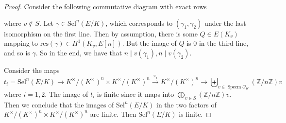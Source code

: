 \documentclass{article}
\newcommand{\ord}{\mathcal{O}}
\newcommand{\kmkn}{K ^{\times} / (K ^{\times})^{n}}
\newcommand{\kvmkn}[1]{(#1) ^{\times} / ((#1) ^{\times})^{n}}
\DeclareMathOperator{\spec}{Specm}
\begin{document}
\begin{proof}
Consider the following commutative diagram with exact rows
\begin{figure}[H]
\centering
{}

\end{figure}
where $ v\not\in S $.
Let $ \gamma\in \mathrm{Sel}^{n}(E/K) $, which corresponds to $ (\gamma _{1}, \gamma _{2}) $
under the last isomorphism on the first line.
Then by assumption, there is some $ Q\in E (K _{v}) $ mapping to 
$ \mathrm{res}(\gamma)\in H ^{1}(K _{v}, E [n]) $.
But the image of $ Q $ is $ 0 $ in the third line, and so is $ \gamma $.
So in the end, we have that $ n\mid v (\gamma _{1}), n\mid v (\gamma _{2}) $.

Consider the maps
$$ t _{i} = \mathrm{Sel}^{n}(E/K) \to \kmkn \times
\kmkn \xrightarrow{\pi _{i}} \kmkn \to \biguplus _{v\in \spec \ord _{K}} (\mathbb{Z}/n \mathbb{Z})v$$
where $ i=1,2 $.
The image of $ t _{i} $ is finite since it maps into $ \bigoplus _{v\in S}
(\mathbb{Z}/n \mathbb{Z})v$.
Then we conclude that
the images of $ \mathrm{Sel}^{n}(E/K) $ in the two factors of $\kmkn\times \kmkn $ are finite.
Then $ \mathrm{Sel}^{n}(E/K) $ is finite.
\end{proof}
\end{document}
